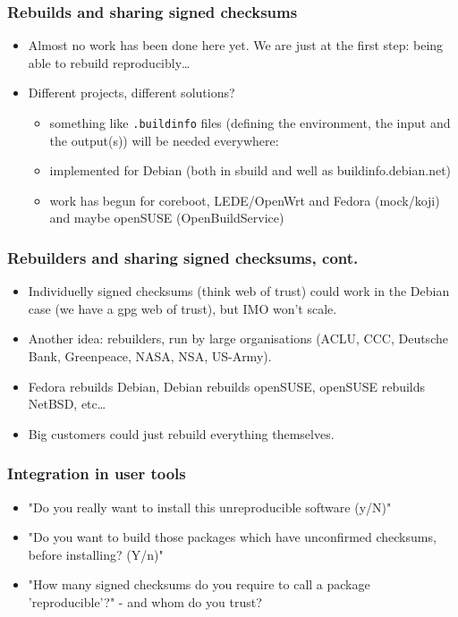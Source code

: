 \documentclass[14pt,aspectratio=169]{beamer}
\begin{document}
\begin{frame}
 \frametitle{Rebuilds and sharing signed checksums}
 \begin{itemize}
  \item Almost no work has been done here yet. We are just at the first step:
  being able to rebuild reproducibly…
  \item Different projects, different solutions?
 \begin{itemize}
  \item<2> something like \texttt{.buildinfo} files (defining the environment,
  the input and the output(s)) will be needed everywhere:
  \item<2> implemented for Debian (both in sbuild and well as
  buildinfo.debian.net)
  \item<2> work has begun for coreboot, LEDE/OpenWrt and Fedora (mock/koji)
  and maybe openSUSE (OpenBuildService)
 \end{itemize}
 \end{itemize}
\end{frame}

\begin{frame}
 \frametitle{Rebuilders and sharing signed checksums, cont.}
 \begin{itemize}
  \item Individuelly signed checksums (think web of trust) could work in the
  Debian case (we have a gpg web of trust), but IMO won't scale.
  \item { Another idea: rebuilders, run by large organisations
  (ACLU, CCC, Deutsche Bank, Greenpeace, NASA, NSA, US-Army).}
  \item Fedora rebuilds Debian, Debian rebuilds openSUSE, openSUSE rebuilds
  NetBSD, etc…
  \item Big customers could just rebuild everything themselves.
 \end{itemize}
\end{frame}


\begin{frame}
 \frametitle{Integration in user tools}
 \begin{itemize}
  \item "Do you really want to install this unreproducible software (y/N)"
  \item<2-3> "Do you want to build those packages which have unconfirmed checksums,
  before installing? (Y/n)"
  \item<3>{ "How many signed checksums do you require to call a package
  'reproducible'?" - and whom do you trust?}
 \end{itemize}
\end{frame}
\end{document}
